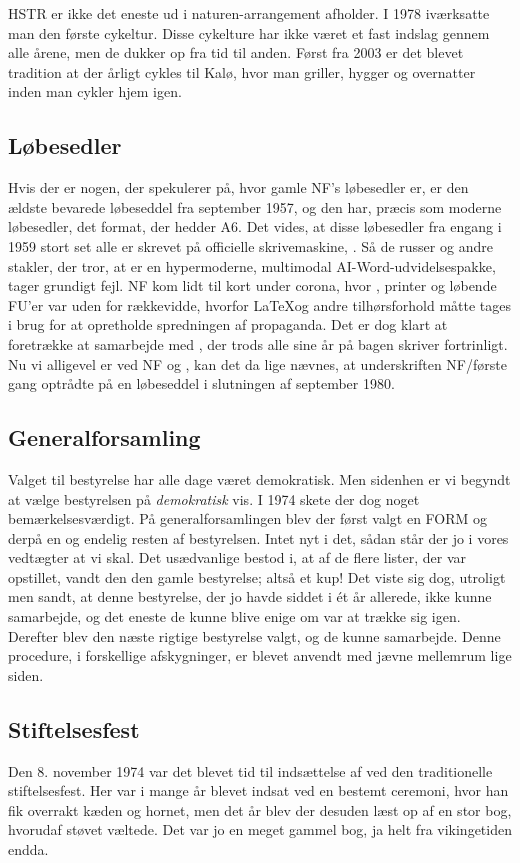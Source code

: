 HSTR er ikke det eneste ud i naturen-arrangement \TKET afholder. I 1978 iværksatte man den første cykeltur. Disse cykelture har ikke været et fast indslag gennem alle årene, men de dukker op fra tid til anden. Først fra 2003 er det blevet tradition at der årligt cykles til Kalø, hvor man griller, hygger og overnatter inden man cykler hjem igen.

\subsection{Løbesedler}
Hvis der er nogen, der spekulerer på, hvor gamle NF's løbesedler er, er den ældste bevarede løbeseddel fra september 1957, og den har, præcis som moderne løbesedler, det format, der hedder A6. Det vides, at disse løbesedler fra engang i 1959 stort set alle er skrevet på \TKETs officielle skrivemaskine, \RemToR. Så de russer og andre stakler, der tror, at \RemToR er en hypermoderne, multimodal AI-Word-udvidelsespakke, tager grundigt fejl. NF kom lidt til kort under corona, hvor \RemToR, printer og løbende FU'er var uden for rækkevidde, hvorfor \LaTeX og andre tilhørsforhold måtte tages i brug for at opretholde spredningen af propaganda. Det er dog klart at foretrække at samarbejde med \RemToR, der trods alle sine år på bagen skriver fortrinligt. Nu vi alligevel er ved NF og \RemToR, kan det da lige nævnes, at underskriften NF/\RemToR første gang optrådte på en løbeseddel i slutningen af september 1980.

\subsection{Generalforsamling}
Valget til \TKETs bestyrelse har alle dage været demokratisk. Men sidenhen er vi begyndt at vælge bestyrelsen på \textit{demokratisk} vis. I 1974 skete der dog noget bemærkelsesværdigt. På generalforsamlingen blev der først valgt en FORM og derpå en \CERM og endelig resten af bestyrelsen. Intet nyt i det, sådan står der jo i vores vedtægter at vi skal. Det usædvanlige bestod i, at af de flere lister, der var opstillet, vandt den den gamle bestyrelse; altså et kup! Det viste sig dog, utroligt men sandt, at denne bestyrelse, der jo havde siddet i ét år allerede, ikke kunne samarbejde, og det eneste de kunne blive enige om var at trække sig igen. Derefter blev den næste rigtige bestyrelse valgt, og de kunne samarbejde. Denne procedure, i forskellige afskygninger, er blevet anvendt med jævne mellemrum lige siden.

\subsection{Stiftelsesfest}
Den 8. november 1974 var det blevet tid til indsættelse af \CERM ved den traditionelle stiftelsesfest. Her var \CERM i mange år blevet indsat ved en bestemt ceremoni, hvor han fik overrakt kæden og hornet, men det år blev der desuden læst op af en stor bog, hvorudaf støvet væltede. Det var jo en meget gammel bog, ja helt fra vikingetiden endda.

